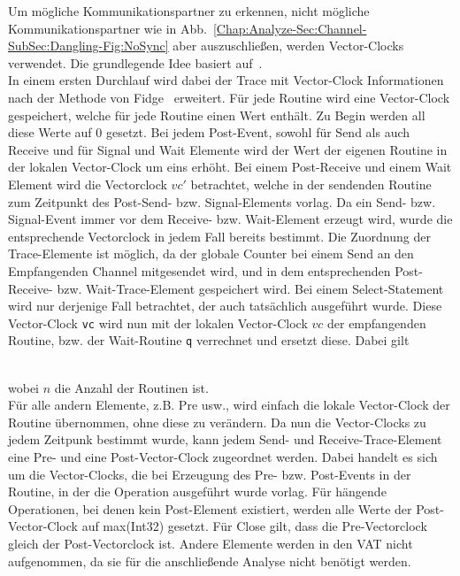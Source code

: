 Um mögliche Kommunikationspartner zu erkennen, nicht mögliche Kommunikationspartner wie in 
Abb.~\ref{Chap:Analyze-Sec:Channel-SubSec:Dangling-Fig:NoSync} aber auszuschließen, werden
Vector-Clocks verwendet. Die grundlegende Idee basiert auf~\cite{PPDP18}.\\
In einem ersten Durchlauf wird dabei der Trace mit Vector-Clock Informationen nach der Methode 
von Fidge~\cite{Fidge} erweitert. Für jede Routine 
wird eine Vector-Clock gespeichert, welche für jede Routine einen Wert enthält. Zu Begin werden 
all diese Werte auf 0 gesetzt. Bei jedem Post-Event, sowohl für Send als auch Receive und für 
Signal und Wait Elemente wird der Wert der eigenen Routine in der lokalen Vector-Clock um eins 
erhöht. Bei einem Post-Receive und einem Wait Element wird die Vectorclock $vc'$ betrachtet, 
welche in der sendenden Routine zum Zeitpunkt des Post-Send- bzw. Signal-Elements vorlag. 
Da ein Send- bzw. Signal-Event immer vor dem Receive- bzw. Wait-Element erzeugt wird, wurde 
die entsprechende Vectorclock in jedem Fall bereits bestimmt. Die Zuordnung der Trace-Elemente 
ist möglich, da der globale Counter bei einem Send an den Empfangenden Channel mitgesendet 
wird, und in dem entsprechenden Post-Receive- bzw. Wait-Trace-Element gespeichert wird.
Bei einem Select-Statement wird nur derjenige Fall betrachtet, der auch tatsächlich ausgeführt wurde.
Diese Vector-Clock \texttt{vc}
wird nun mit der lokalen Vector-Clock $vc$ der empfangenden Routine, bzw. der Wait-Routine 
\texttt{q} verrechnet und ersetzt diese. Dabei gilt\\
\begin{figure}[h]
  \centering
  
\end{figure}\\
wobei $n$ die Anzahl der Routinen ist.\\
Für alle andern Elemente, z.B. Pre usw., wird einfach die lokale Vector-Clock der Routine übernommen, 
ohne diese zu verändern. Da nun die Vector-Clocks zu jedem Zeitpunk bestimmt wurde, kann jedem 
Send- und Receive-Trace-Element eine Pre- und eine Post-Vector-Clock zugeordnet werden. 
Dabei handelt es sich um die Vector-Clocks, die bei Erzeugung des Pre- bzw. Post-Events in 
der Routine, in der die Operation ausgeführt wurde vorlag. Für hängende Operationen, 
bei denen kein Post-Element existiert, werden alle Werte der Post-Vector-Clock auf 
max(Int32) gesetzt. Für Close gilt, 
dass die Pre-Vectorclock gleich der Post-Vectorclock ist. Andere Elemente 
werden in den VAT nicht aufgenommen, da sie 
für die anschließende Analyse nicht benötigt werden.

